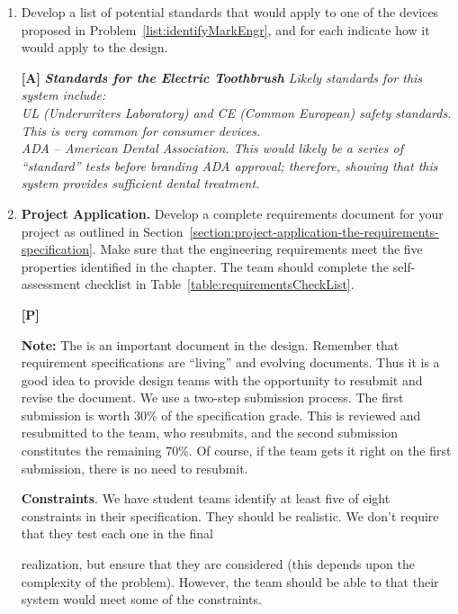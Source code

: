 \begin{enumerate}
  \item
    Develop a list of potential standards that would apply to one of the
    devices proposed in Problem~\ref{list:identifyMarkEngr}, and for each indicate how it would
    apply to the design.
    
\begin{onlysolution}
    \textbf{[A]}
   \itshape
\textbf{Standards for the Electric Toothbrush}
Likely standards for this system include:\\
UL (Underwriters Laboratory) and CE (Common European) safety standards.
This is very common for consumer devices.\\
ADA -- American Dental Association. This would likely be a series of
``standard'' tests before branding ADA approval; therefore, showing that
this system provides sufficient dental treatment.
\end{onlysolution}    

    
  \item
    \textbf{Project Application.} Develop a complete requirements
    document for your project as outlined in 
    Section~\ref{section:project-application-the-requirements-specification}. Make sure that
    the engineering requirements meet the five properties identified in
    the chapter. The team should complete the self-assessment checklist
    in Table~\ref{table:requirementsCheckList}.
    
    
\begin{onlysolution}
    \textbf{[P]}
   \itshape    
   
\textbf{Note:} The  is an
important document in the design. Remember that requirement specifications are ``living'' and evolving
documents. Thus it is a good idea to provide design teams with the opportunity to resubmit and
revise the document. We use a two-step submission process. The first submission is
worth 30\% of the specification grade. This is reviewed and resubmitted to the team,
who resubmits, and the second submission constitutes the remaining 70\%. Of course,
if the team gets it right on the first submission, there is no need to resubmit.

\textbf{Constraints}. We have student teams identify at least
five of eight constraints in their specification. They should be
realistic. We don't require that they test each one in the final

realization, but ensure that they are considered (this depends upon the
complexity of the problem). However, the team should be able to that
their system would meet some of the constraints.


\end{onlysolution}
\end{enumerate}
